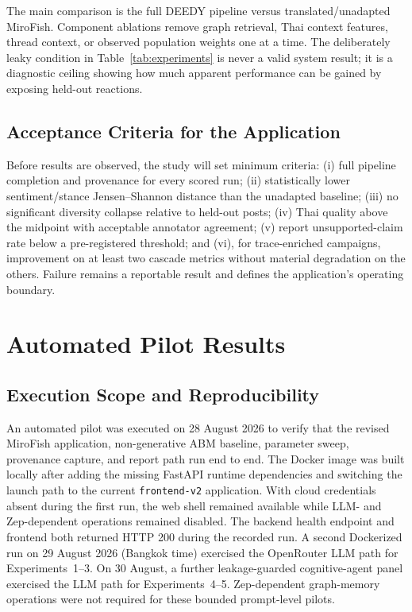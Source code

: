 \documentclass[conference]{IEEEtran}
\begin{document}
The main comparison is the full DEEDY pipeline versus translated/unadapted
MiroFish. Component ablations remove graph retrieval, Thai context features,
thread context, or observed population weights one at a time. The deliberately
leaky condition in Table~\ref{tab:experiments} is never a valid system result;
it is a diagnostic ceiling showing how much apparent performance can be gained
by exposing held-out reactions.

\subsection{Acceptance Criteria for the Application}

Before results are observed, the study will set minimum criteria: (i) full
pipeline completion and provenance for every scored run; (ii) statistically
lower sentiment/stance Jensen--Shannon distance than the unadapted baseline;
(iii) no significant diversity collapse relative to held-out posts; (iv) Thai
quality above the midpoint with acceptable annotator agreement; (v) report
unsupported-claim rate below a pre-registered threshold; and (vi), for
trace-enriched campaigns, improvement on at least two cascade metrics without
material degradation on the others. Failure remains a reportable result and
defines the application's operating boundary.

\section{Automated Pilot Results}
\label{sec:pilot-results}

\subsection{Execution Scope and Reproducibility}

An automated pilot was executed on 28 August 2026 to verify that the revised
MiroFish application, non-generative ABM baseline, parameter sweep, provenance
capture, and report path run end to end. The Docker image was built locally
after adding the missing FastAPI runtime dependencies and switching the launch
path to the current \texttt{frontend-v2} application. With cloud credentials
absent during the first run, the web shell remained available while LLM- and
Zep-dependent operations remained disabled. The backend health endpoint and
frontend both returned HTTP 200 during the recorded run. A second Dockerized
run on 29 August 2026 (Bangkok time) exercised the OpenRouter LLM path for
Experiments~1--3. On 30 August, a further leakage-guarded cognitive-agent panel
exercised the LLM path for Experiments~4--5. Zep-dependent graph-memory
operations were not required for these bounded prompt-level pilots.
\end{document}
